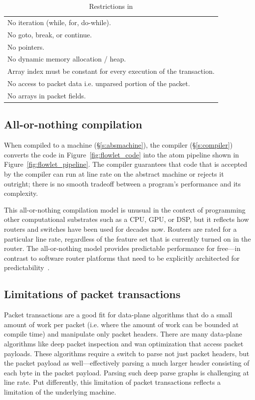 \begin{table}
  \begin{tabular}{p{}}
    No iteration (while, for, do-while).\\
    No goto, break, or continue.\\
    No pointers.\\
    No dynamic memory allocation / heap.\\
    Array index must be constant for every execution of the transaction.\\
    No access to packet data i.e. unparsed portion of the packet.\\
    No arrays in packet fields.\\
  \end{tabular}
  \caption{Restrictions in \pktlanguage}
  \label{tab:restrict}
\end{table}

\subsection{All-or-nothing compilation}

When compiled to a \absmachine machine (\S\ref{s:absmachine}), the \pktlanguage
compiler (\S\ref{s:compiler}) converts the code in Figure~\ref{fig:flowlet_code}
into the atom pipeline shown in Figure~\ref{fig:flowlet_pipeline}. The compiler
guarantees that code that is accepted by the compiler can run at line rate on
the abstract machine or rejects it outright; there is no smooth tradeoff between
a program's performance and its complexity.

This all-or-nothing compilation model is unusual in the context of programming
other computational substrates such as a CPU, GPU, or DSP, but it reflects how
routers and switches have been used for decades now. Routers are rated
for a particular line rate, regardless of the feature set that is currently turned
on in the router. The all-or-nothing model provides predictable performance for
free---in contrast to software router platforms that need to be explicitly architected
for predictability~\cite{dobrescu2012, wenfei15}.

\subsection{Limitations of packet transactions}

Packet transactions are a good fit for data-plane algorithms that do a small
amount of work per packet (i.e. where the amount of work can be bounded at
compile time) and manipulate only packet headers. There are many data-plane
algorithms like deep packet inspection and wan optimization that access packet
payloads. These algorithms require a switch to parse not just packet headers,
but the packet payload as well---effectively parsing a much larger header
consisting of each byte in the packet payload. Parsing such deep parse graphs
is challenging at line rate. Put differently, this limitation of packet
transactions reflects a limitation of the underlying \absmachine machine.
